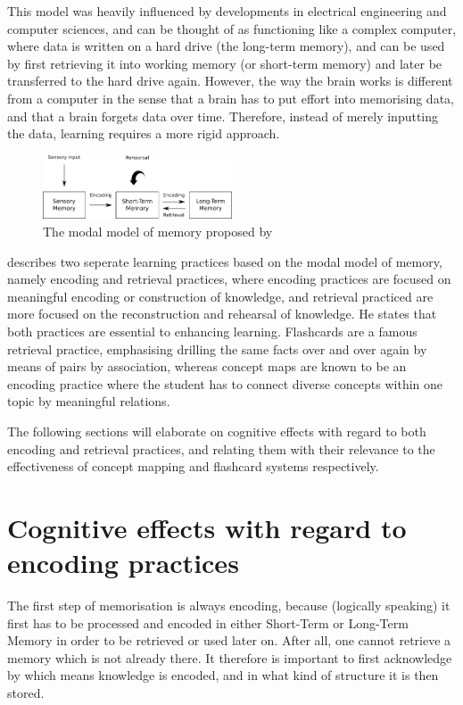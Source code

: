 This model was heavily influenced by developments in electrical engineering and computer sciences, and can be thought of as functioning like a complex computer, where data is written on a hard drive (the long-term memory), and can be used by first retrieving it into working memory (or short-term memory) and later be transferred to the hard drive again. However, the way the brain works is different from a computer in the sense that a brain has to put effort into memorising data, and that a brain forgets data over time. Therefore, instead of merely inputting the data, learning requires a more rigid approach.

\begin{figure}
    \centering
    \includegraphics[width=0.5\textwidth]{img/modalmemory.png}
    \caption{The modal model of memory proposed by \protect{}}
    \label{fig:modalmemory}
\end{figure}

 describes two seperate learning practices based on the modal model of memory, namely encoding and retrieval practices, where encoding practices are focused on meaningful encoding or construction of knowledge, and retrieval practiced are more focused on the reconstruction and rehearsal of knowledge. He states that both practices are essential to enhancing learning. Flashcards are a famous retrieval practice, emphasising drilling the same facts over and over again by means of pairs by association, whereas concept maps are known to be an encoding practice where the student has to connect diverse concepts within one topic by meaningful relations.

The following sections will elaborate on cognitive effects with regard to both encoding and retrieval practices, and relating them with their relevance to the effectiveness of concept mapping and flashcard systems respectively.

\section{Cognitive effects with regard to encoding practices}

The first step of memorisation is always encoding, because (logically speaking) it first has to be processed and encoded in either Short-Term or Long-Term Memory in order to be retrieved or used later on. After all, one cannot retrieve a memory which is not already there. It therefore is important to first acknowledge by which means knowledge is encoded, and in what kind of structure it is then stored.

